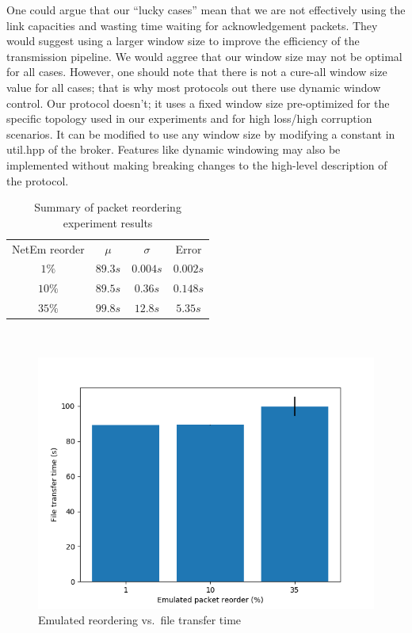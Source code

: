 \documentclass[conference]{IEEEtran}
\begin{document}
One could argue that our ``lucky cases'' mean that we are not effectively using the
link capacities and wasting time waiting for acknowledgement packets. They would
suggest using a larger window size to improve the efficiency of the transmission pipeline.
We would aggree that our window size may not be optimal for all cases.
However, one should note that there is not a cure-all window size value for all cases;
that is why most protocols out there use dynamic window control. Our protocol doesn't;
it uses a fixed window size pre-optimized for the specific topology used in our experiments
and for high loss/high corruption scenarios. It can be modified to use
any window size by modifying a constant in util.hpp of the broker.
Features like dynamic windowing may also be implemented without making breaking changes to
the high-level description of the protocol.

\begin{table}
    \centering
    \begin{tabular}{c c c c}
        \toprule
        NetEm reorder & $\mu$ & $\sigma$ & Error \\
        $1\%$   &   $89.3s$   &   $0.004s$    &   $0.002s$ \\
        $10\%$   &    $89.5s$   &   $0.36s$    &   $0.148s$ \\
        $35\%$   &    $99.8s$   &   $12.8s$    &   $5.35s$ \\
        \bottomrule
    \end{tabular}\label{table:reorder} \\
    \caption{Summary of packet reordering experiment results}\label{table:reorder}
\end{table}

\begin{figure}
    \centering
    \includegraphics[scale=0.6]{graphics/plot-reorder}
    \caption{Emulated reordering vs.\ file transfer time}\label{fig:reorder}
\end{figure}
\end{document}
